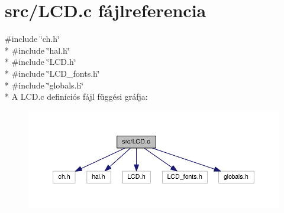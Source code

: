 \section{src/\-L\-C\-D.c fájlreferencia}
\label{_l_c_d_8c}
{\ttfamily \#include \char`\"{}ch.\-h\char`\"{}}\\*
{\ttfamily \#include \char`\"{}hal.\-h\char`\"{}}\\*
{\ttfamily \#include \char`\"{}L\-C\-D.\-h\char`\"{}}\\*
{\ttfamily \#include \char`\"{}L\-C\-D\-\_\-fonts.\-h\char`\"{}}\\*
{\ttfamily \#include \char`\"{}globals.\-h\char`\"{}}\\*
A L\-C\-D.\-c definíciós fájl függési gráfja\-:
\nopagebreak
\begin{figure}[H]
\begin{center}
\leavevmode
\includegraphics[width=350pt]{_l_c_d_8c__incl}
\end{center}
\end{figure}
